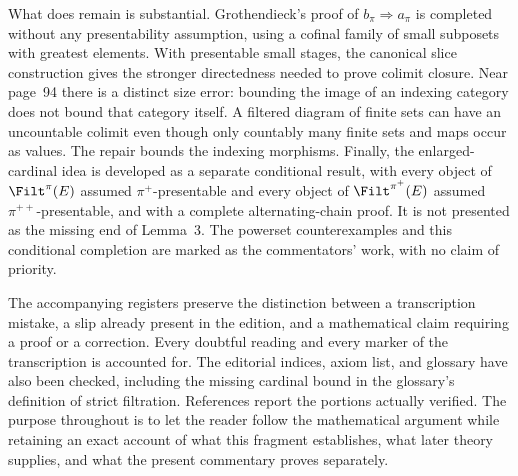 What does remain is substantial. Grothendieck's proof of $b_\pi\Rightarrow a_\pi$ is completed without any presentability assumption, using a cofinal family of small subposets with greatest elements. With presentable small stages, the canonical slice construction gives the stronger directedness needed to prove colimit closure. Near page~94 there is a distinct size error: bounding the image of an indexing category does not bound that category itself. A filtered diagram of finite sets can have an uncountable colimit even though only countably many finite sets and maps occur as values. The repair bounds the indexing morphisms. Finally, the enlarged-cardinal idea is developed as a separate conditional result, with every object of $\Filt^\pi(E)$ assumed $\pi^+$-presentable and every object of $\Filt^{\pi^+}(E)$ assumed $\pi^{++}$-presentable, and with a complete alternating-chain proof. It is not presented as the missing end of Lemma~3. The powerset counterexamples and this conditional completion are marked as the commentators' work, with no claim of priority.

The accompanying registers preserve the distinction between a transcription mistake, a slip already present in the edition, and a mathematical claim requiring a proof or a correction. Every doubtful reading and every marker of the transcription is accounted for. The editorial indices, axiom list, and glossary have also been checked, including the missing cardinal bound in the glossary's definition of strict filtration. References report the portions actually verified. The purpose throughout is to let the reader follow the mathematical argument while retaining an exact account of what this fragment establishes, what later theory supplies, and what the present commentary proves separately.

